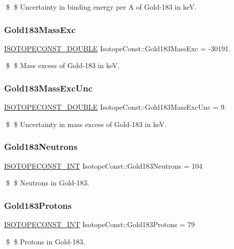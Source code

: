 \$ \$ Uncertainty in binding energy per A of Gold-\/183 in keV. \mbox{\label{group___isotope_const-_gold-_au183_ga0c862455276625ee82846d44f1081795}} 
\subsubsection{\texorpdfstring{Gold183\+Mass\+Exc}{Gold183MassExc}}
{\footnotesize\ttfamily \mbox{\hyperlink{group___isotope_const-_macros_ga8f45a7272ce02c0b4c65c44636ed719a}{I\+S\+O\+T\+O\+P\+E\+C\+O\+N\+S\+T\+\_\+\+D\+O\+U\+B\+LE}} Isotope\+Const\+::\+Gold183\+Mass\+Exc = -\/30191.}

\$ \$ Mass excess of Gold-\/183 in keV. \mbox{\label{group___isotope_const-_gold-_au183_gaf44fe14a9c082f235937bc723d682f67}} 
\subsubsection{\texorpdfstring{Gold183\+Mass\+Exc\+Unc}{Gold183MassExcUnc}}
{\footnotesize\ttfamily \mbox{\hyperlink{group___isotope_const-_macros_ga8f45a7272ce02c0b4c65c44636ed719a}{I\+S\+O\+T\+O\+P\+E\+C\+O\+N\+S\+T\+\_\+\+D\+O\+U\+B\+LE}} Isotope\+Const\+::\+Gold183\+Mass\+Exc\+Unc = 9.}

\$ \$ Uncertainty in mass excess of Gold-\/183 in keV. \mbox{\label{group___isotope_const-_gold-_au183_ga0d7b8275c2d70af2731689e1919b9d03}} 
\subsubsection{\texorpdfstring{Gold183\+Neutrons}{Gold183Neutrons}}
{\footnotesize\ttfamily \mbox{\hyperlink{group___isotope_const-_macros_ga5f18360b3e99483a35c32d789e62621c}{I\+S\+O\+T\+O\+P\+E\+C\+O\+N\+S\+T\+\_\+\+I\+NT}} Isotope\+Const\+::\+Gold183\+Neutrons = 104}

\$ \$ Neutrons in Gold-\/183. \mbox{\label{group___isotope_const-_gold-_au183_ga5b6c4060519dc2b10f4b7cbf5e67cd30}} 
\subsubsection{\texorpdfstring{Gold183\+Protons}{Gold183Protons}}
{\footnotesize\ttfamily \mbox{\hyperlink{group___isotope_const-_macros_ga5f18360b3e99483a35c32d789e62621c}{I\+S\+O\+T\+O\+P\+E\+C\+O\+N\+S\+T\+\_\+\+I\+NT}} Isotope\+Const\+::\+Gold183\+Protons = 79}

\$ \$ Protons in Gold-\/183. 
